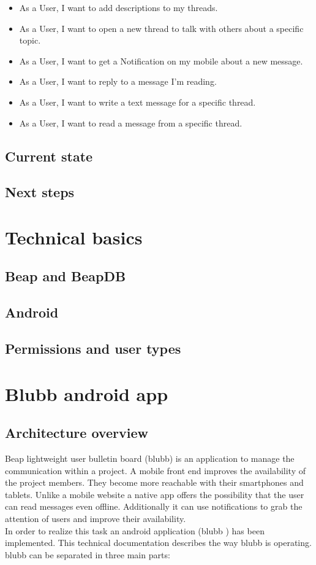 \documentclass[12pt,a4paper,oneside]{report}
\newcommand{\appname}{blubb}
\newcommand{\blubb}{blubb}
\begin{document}
\begin{itemize}
     \item As a User, I want to add descriptions to my threads.
     \item As a User, I want to open a new thread to talk with others about a specific topic.
     \item As a User, I want to get a Notification on my mobile about a new message.
     \item As a User, I want to reply to a message I'm reading.
     \item As a User, I want to write a text message for a specific thread.
     \item As a User, I want to read a message from a specific thread. 
   \end{itemize}
\section{Current state}

\section{Next steps}

\chapter{Technical basics}

\section{Beap and BeapDB}

\section{Android}

\section{Permissions and user types}

\chapter{Blubb android app}
\section{Architecture overview}
 Beap lightweight user bulletin board (\blubb{}) is an application to manage the communication within a project. A mobile front end improves the availability of the project members. They become more reachable with their smartphones and tablets. Unlike a mobile website a native app offers the possibility that the user can read messages even offline. Additionally it can use notifications to grab the attention of users and improve their availability. \\
In order to realize this task an android application (\appname{} ) has been implemented. This technical documentation describes the way  \appname{} is operating.\\
\appname{} can be separated in three main parts: 
\end{document}
